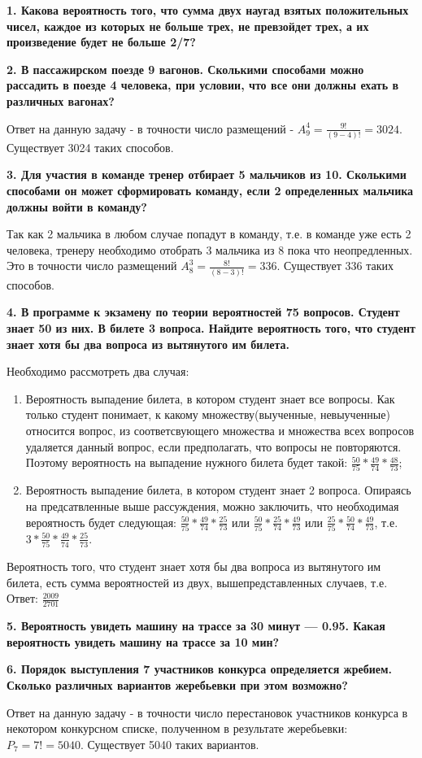 \documentclass{article}
\begin{document}
\textbf{1. Какова вероятность того, что сумма двух наугад взятых положительных чисел, каждое из которых не больше трех, не превзойдет трех, а их произведение будет не больше 2/7?}

\textbf{2. В пассажирском поезде 9 вагонов. Сколькими способами можно рассадить в поезде 4 человека, при условии, что все они должны ехать в различных вагонах?}

Ответ на данную задачу - в точности число размещений - $A^{4}_{9} = \frac{9!}{(9 - 4)!} = 3024$.
Существует 3024 таких способов.

\textbf{3. Для участия в команде тренер отбирает 5 мальчиков из 10. Сколькими способами он может сформировать команду, если 2 определенных мальчика должны войти в команду?}

Так как 2 мальчика в любом случае попадут в команду, т.е. в команде уже есть 2 человека, тренеру необходимо отобрать 3 мальчика из 8 пока что неопредленных. Это  в точности число размещений $A^{3}_{8} = \frac{8!}{(8 - 3)!} = 336$.
Существует 336 таких способов.

\textbf{4. В программе к экзамену по теории вероятностей 75 вопросов. Студент знает 50 из них. В билете 3 вопроса. Найдите вероятность того, что студент знает хотя бы два вопроса из вытянутого им билета.}

Необходимо рассмотреть два случая:
\begin{enumerate}
\item Вероятность выпадение билета, в котором студент знает все вопросы. Как только студент понимает, к какому множеству(выученные, невыученные) относится вопрос, из соответсвующего множества и множества всех вопросов удаляется данный вопрос, если предполагать, что вопросы не повторяются. Поэтому вероятность на выпадение нужного билета будет такой: $\frac{50}{75}*\frac{49}{74}*\frac{48}{73}$;
\item Вероятность выпадение билета, в котором студент знает 2 вопроса. Опираясь на предсатвленные выше рассуждения, можно заключить, что необходимая вероятность будет следующая: $\frac{50}{75}*\frac{49}{74}*\frac{25}{73}$ или $\frac{50}{75}*\frac{25}{74}*\frac{49}{73}$ или $\frac{25}{75}*\frac{50}{74}*\frac{49}{73}$, т.е. $3*\frac{50}{75}*\frac{49}{74}*\frac{25}{73}$.
\end{enumerate}

Вероятность того, что студент знает хотя бы два вопроса из вытянутого им билета, есть сумма вероятностей из двух, вышепредставленных случаев, т.е.
Ответ: $\frac{2009}{2701}$

\textbf{5. Вероятность увидеть машину на трассе за 30 минут — 0.95. Какая вероятность увидеть машину на трассе за 10 мин? }

\textbf{6. Порядок выступления 7 участников конкурса определяется жребием. Сколько различных вариантов жеребьевки при этом возможно?}

Ответ на данную задачу - в точности число перестановок участников конкурса в некотором конкурсном списке, полученном в результате жеребьевки: $P_{7} = 7! = 5040$.
Существует 5040 таких вариантов.
\end{document}
